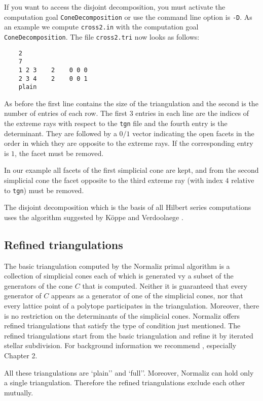 \documentclass[12pt,a4paper]{scrartcl}
\theoremstyle{definition}
\begin{document}
{	If you want to access the disjoint decomposition, you must activate the computation goal \verb|ConeDecomposition| or use the command line option is \verb|-D|. As an example we compute \verb|cross2.in| with the computation goal \verb|ConeDecomposition|. The file \verb|cross2.tri| now looks as follows:
	
	\begin{Verbatim}
	2
	7
	1 2 3    2    0 0 0
	2 3 4    2    0 0 1
	plain
	\end{Verbatim}
	
	As before the first line contains the size of the triangulation and the second is the number of entries of each row.
	The first $3$ entries in each line are the indices of the extreme rays with respect to the \verb|tgn| file and the fourth entry is the determinant. They are followed by a $0/1$ vector indicating the open facets in the order in which they are opposite to the extreme rays. If the corresponding entry is $1$, the facet must be removed. 
	
	In our example all facets of the first simplicial cone are kept, and from the second simplicial cone the facet opposite to the third extreme ray (with index $4$ relative to \verb|tgn|) must be removed.
	
	The disjoint decomposition which is the basis of all Hilbert series computations uses the algorithm suggested by K\"oppe and Verdoolaege \cite{KV}.
	
	\subsection{Refined triangulations}
	
	The basic triangulation computed by the Normaliz primal algorithm is a collection of simplicial cones each of which is generated vy a subset of the generators of the cone $C$ that is computed. Neither it is guaranteed that every generator of $C$ appears as a generator of one of the simplicial cones, nor that every lattice point of a polytope participates in the triangulation. Moreover, there is no restriction on the determinants of the simplicial cones. Normaliz offers refined triangulations that satisfy the type of condition just mentioned. The refined triangulations start from the basic triangulation and refine it by iterated stellar subdivision. For background information we recommend \cite{BG}, especially Chapter 2.
	
	All these triangulations are `plain'' and `full''. Moreover, Normaliz can hold only a single triangulation. Therefore the refined triangulations exclude each other mutually. 
	
}
\end{document}

